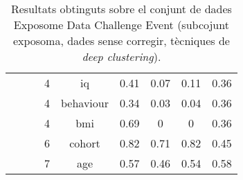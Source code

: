 \documentclass[CAT,BIB]{TFUOC}%
\begin{document}
\begin{table}
\begin{tabular}{@{}ccccccccc@{}}
            &  &  & 4 & iq & 0.41 & 0.07 & 0.11 & 0.36 \\
            &  &  & 4 & behaviour & 0.34 & 0.03 & 0.04 & 0.36 \\
            &  &  & 4 & bmi & 0.69 & 0 & 0 & 0.36 \\
            &  &  & 6 & cohort & 0.82 & 0.71 & 0.82 & 0.45 \\
            &  &  & 7 & age & 0.57 & 0.46 & 0.54 & 0.58 \\ \bottomrule
        \end{tabular}
        \caption[Exposome Data Challenge Event: resultats - part 8]{
            Resultats obtinguts sobre el conjunt de dades Exposome Data Challenge Event
            (subcojunt exposoma, dades sense corregir, tècniques de \textit{deep clustering}).
        }
        \label{t:results_exposome8}
    \end{table}
\end{document}
